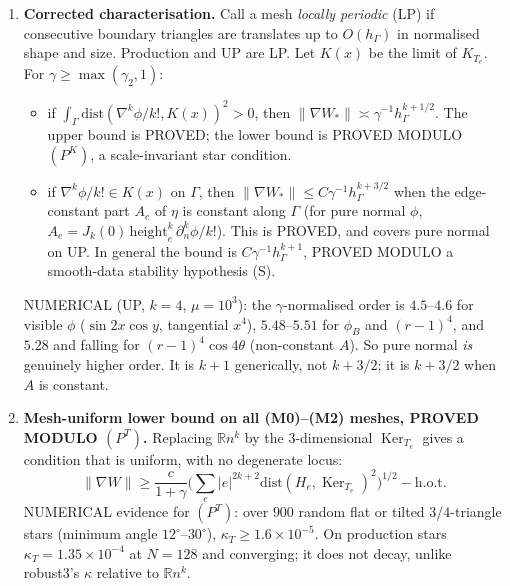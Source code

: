 \documentclass[11pt]{article}
\theoremstyle{remark}
\newcommand{\hG}{h_\Gamma}
\begin{document}
\begin{enumerate}
$\nabla^4\phi_B/4!=\cos(4\theta)\,(x^4-(x-y/\rho)^4)$ on $\Gamma$, which is not purely normal. Then
$\|\nabla W_\ast(\phi_B)\|\le C\gamma^{-1}\hG^{k+3/2}$. This is PROVED (Thm~\ref{thm:up}). NUMERICALLY the observed order is
$5.45,5.47,5.48,5.48$ ($N=48..96$), while $\eta$ is $99\%$ edge-oscillatory. So neither ``not purely normal'' nor ``edge-oscillating $\eta$'' is
sufficient.
\item \textbf{Corrected characterisation.} Call a mesh \emph{locally periodic} (LP) if consecutive boundary triangles are
translates up to $O(\hG)$ in normalised shape and size. Production and \textsf{UP} are LP. Let $K(x)$ be the limit of
$K_{T_e}$. For $\gamma\ge\max(\gamma_2,1)$:
 \begin{itemize}
 \item if $\int_\Gamma\mathrm{dist}(\nabla^k\phi/k!,K(x))^2>0$, then $\|\nabla W_\ast\|\asymp\gamma^{-1}\hG^{k+1/2}$. The upper
 bound is PROVED; the lower bound is PROVED MODULO $(P^K)$, a scale-invariant star condition.
 \item if $\nabla^k\phi/k!\in K(x)$ on $\Gamma$, then $\|\nabla W_\ast\|\le C\gamma^{-1}\hG^{k+3/2}$ when the edge-constant
 part $A_e$ of $\eta$ is constant along $\Gamma$ (for pure normal $\phi$, $A_e=J_k(0)\,\mathrm{height}_e^k\,\partial_n^k\phi/k!$). This is PROVED, and covers pure normal on \textsf{UP}. In general the bound
 is $C\gamma^{-1}\hG^{k+1}$, PROVED MODULO a smooth-data stability hypothesis (S).
 \end{itemize}
 NUMERICAL (\textsf{UP}, $k=4$, $\mu=10^3$): the $\gamma$-normalised order is $4.5$--$4.6$ for visible $\phi$ ($\sin2x\cos y$,
 tangential $x^4$), $5.48$--$5.51$ for $\phi_B$ and $(r-1)^4$, and $5.28$ and falling for $(r-1)^4\cos4\theta$ (non-constant $A$).
 So pure normal \emph{is} genuinely higher order. It is $k+1$ generically, not $k+3/2$; it is $k+3/2$ when $A$ is constant.
\item \textbf{Mesh-uniform lower bound on all (M0)--(M2) meshes, PROVED MODULO $(P^T)$.} Replacing $\mathbb Rn^k$ by the
$3$-dimensional $\operatorname{Ker}_{T_e}$ gives a condition that is uniform, with no degenerate locus:
\[
\|\nabla W\|\ge\frac{c}{1+\gamma}\Big(\sum_e|e|^{2k+2}\mathrm{dist}(H_e,\operatorname{Ker}_{T_e})^2\Big)^{1/2}-\text{h.o.t.}
\]
NUMERICAL evidence for $(P^T)$: over $900$ random flat or tilted $3$/$4$-triangle stars (minimum angle $12^\circ$--$30^\circ$),
$\kappa_T\ge1.6\times10^{-5}$. On production stars $\kappa_T=1.35\times10^{-4}$ at $N=128$ and converging; it does not decay,
unlike robust3's $\kappa$ relative to $\mathbb Rn^k$.
\end{enumerate}
\end{document}
